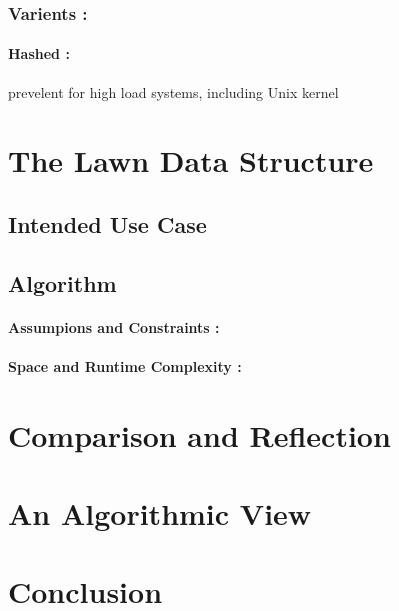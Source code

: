 \documentclass[twocolumn,a4paper]{article}
\begin{document}
\subsubsection{Varients :}

\paragraph{Hashed :}
prevelent for high load systems, including Unix kernel



\section{The Lawn Data Structure}

\subsection{Intended Use Case}

\subsection{Algorithm}

\paragraph{Assumpions and Constraints :}

\paragraph{Space and Runtime Complexity :}

\section{Comparison and Reflection}

\section{An Algorithmic View}

\section{Conclusion}



\end{document}
